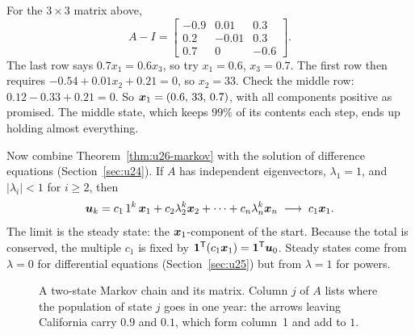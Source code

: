 \begin{example}\label{ex:u26-3by3}
For the $3\times3$ matrix above,
\[
  A-I=\begin{bmatrix} -0.9&0.01&0.3\\ 0.2&-0.01&0.3\\ 0.7&0&-0.6\end{bmatrix}.
\]
The last row says $0.7x_1=0.6x_3$, so try $x_1=0.6$, $x_3=0.7$. The first row then requires
$-0.54+0.01x_2+0.21=0$, so $x_2=33$. Check the middle row:
$0.12-0.33+0.21=0$. So $\boldsymbol{x}_1=(0.6,\,33,\,0.7)$, with all components positive as
promised. The middle state, which keeps $99\%$ of its contents each step, ends up holding
almost everything.
\end{example}

Now combine Theorem~\ref{thm:u26-markov} with the solution of difference equations
(Section~\ref{sec:u24}). If $A$ has independent eigenvectors, $\lambda_1=1$,
and $|\lambda_i|<1$ for $i\ge2$, then
\[
  \boldsymbol{u}_k=c_1\,1^{k}\,\boldsymbol{x}_1+c_2\lambda_2^{k}\boldsymbol{x}_2+\dots+c_n\lambda_n^{k}\boldsymbol{x}_n
  \;\longrightarrow\;c_1\boldsymbol{x}_1 .
\]
The limit is the steady state: the $\boldsymbol{x}_1$-component of the start. Because the total is
conserved, the multiple $c_1$ is fixed by $\boldsymbol{1}^{\mathsf{T}}(c_1\boldsymbol{x}_1)=\boldsymbol{1}^{\mathsf{T}}\boldsymbol{u}_0$. Steady states
come from $\lambda=0$ for differential equations (Section~\ref{sec:u25}) but from
$\lambda=1$ for powers.

\begin{figure}[ht]\centering
{}
\caption{A two-state Markov chain and its matrix. Column $j$ of $A$ lists where the
population of state $j$ goes in one year: the arrows leaving California carry $0.9$ and
$0.1$, which form column~1 and add to $1$.}
\label{fig:u26-chain}
\end{figure}

